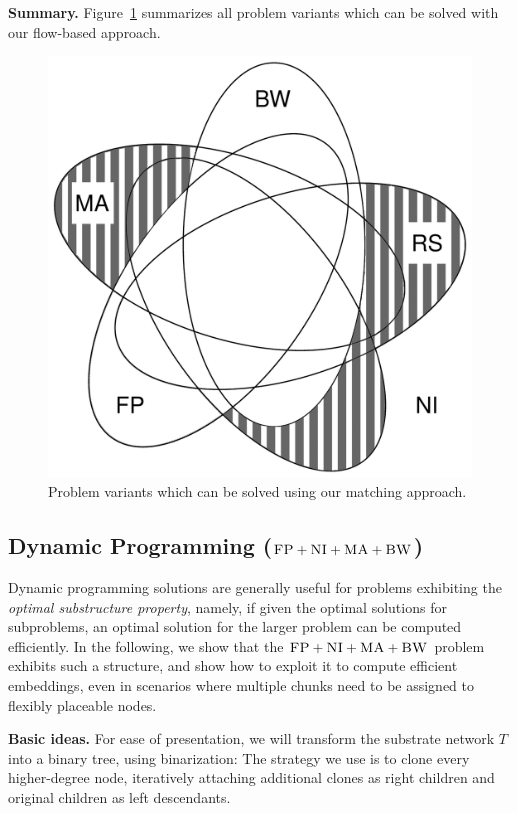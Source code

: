\documentclass[9pt,twocolumn]{scrartcl}
\newcommand{\CC}{\textsc{NI}}
\newcommand{\FP}{\textsc{FP}}
\newcommand{\BW}{\textsc{BW}}
\newcommand{\MA}{\textsc{MA}}
\newcommand{\Tree}{\ensuremath{T}}
\begin{document}
\textbf{Summary.}
Figure~\ref{fig:venn_match} summarizes all problem
variants which can be solved with our flow-based approach.
\begin{figure}
\includegraphics[width=\columnwidth]{figs/venn_matching.pdf}
\caption{Problem variants which can be solved using our matching approach.}
\label{fig:venn_match}
\end{figure}


\subsection{Dynamic Programming ($\FP+\CC+\MA+\BW$)}\label{ssec:dyn}

Dynamic programming solutions are generally useful for problems
exhibiting the \emph{optimal substructure property}, namely, if given
the optimal solutions for subproblems, an optimal solution for the
larger problem can be computed efficiently.
In the following, we show that the $\FP+\CC+\MA+\BW$ problem
exhibits such a structure, and show how to exploit it to
compute efficient embeddings, even in scenarios where multiple chunks
need to be assigned to flexibly placeable nodes.

\textbf{Basic ideas.} For ease of presentation, we will transform the substrate network $\Tree$
into a binary tree, using binarization:
The
strategy we use is to clone every higher-degree node,
iteratively attaching additional clones as right children 
and original children as left descendants. 
\end{document}
